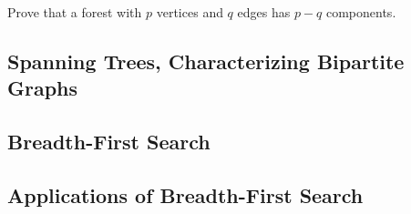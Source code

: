 \documentclass[class=math239,notes,tikz]{agony}
\begin{document}
\begin{xca}
  Prove that a forest with $p$ vertices and $q$ edges has $p - q$ components.
\end{xca}

\setcounter{subsection}{3}
\subsection{Spanning Trees, Characterizing Bipartite Graphs}

\subsection{Breadth-First Search}

\subsection{Applications of Breadth-First Search}
\end{document}
